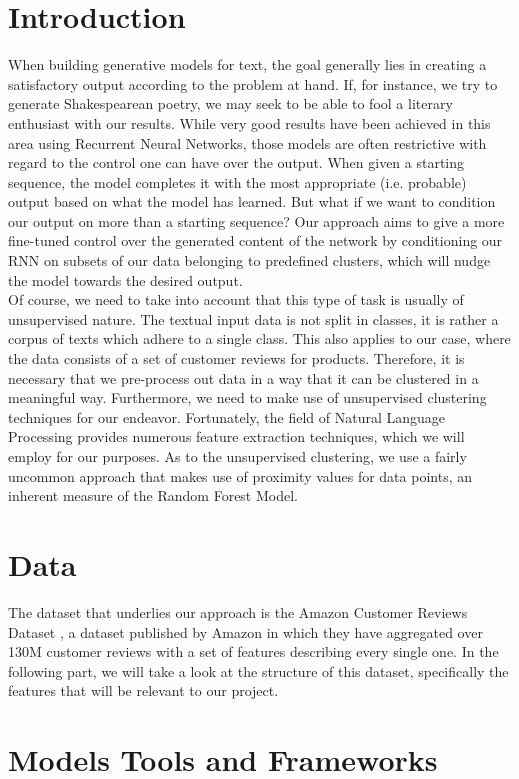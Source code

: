 \documentclass[]{report}
\begin{document}
\chapter{Introduction}
When building generative models for text, the goal generally lies in creating a satisfactory output according to the problem at hand. If, for instance, we try to generate Shakespearean poetry, we may seek to be able to fool a literary enthusiast with our results. While very good results have been achieved in this area using Recurrent Neural Networks\cite{karpathy}, those models are often restrictive with regard to the control one can have over the output. When given a starting sequence, the model completes it with the most appropriate (i.e. probable) output based on what the model has learned. But what if we want to condition our output on more than a starting sequence? Our approach aims to give a more fine-tuned control over the generated content of the network by conditioning our RNN on subsets of our data belonging to predefined clusters, which will nudge the model towards the desired output. \\
Of course, we need to take into account that this type of task is usually of unsupervised nature. The textual input data is not split in classes, it is rather a corpus of texts which adhere to a single class. This also applies to our case, where the data consists of a set of customer reviews for products. Therefore, it is necessary that we pre-process out data in a way that it can be clustered in a meaningful way. Furthermore, we need to make use of unsupervised clustering techniques for our endeavor. Fortunately, the field of Natural Language Processing provides numerous feature extraction techniques, which we will employ for our purposes. As to the unsupervised clustering, we use a fairly uncommon approach that makes use of proximity values for data points, an inherent measure of the Random Forest Model. 


\chapter{Data}
The dataset that underlies our approach is the Amazon Customer Reviews Dataset \cite{amazondataset}, a dataset published by Amazon in which they have aggregated over 130M customer reviews with a set of features describing every single one. In the following part, we will take a look at the structure of this dataset, specifically the features that will be relevant to our project.

\chapter{Models Tools and Frameworks}
\end{document}

